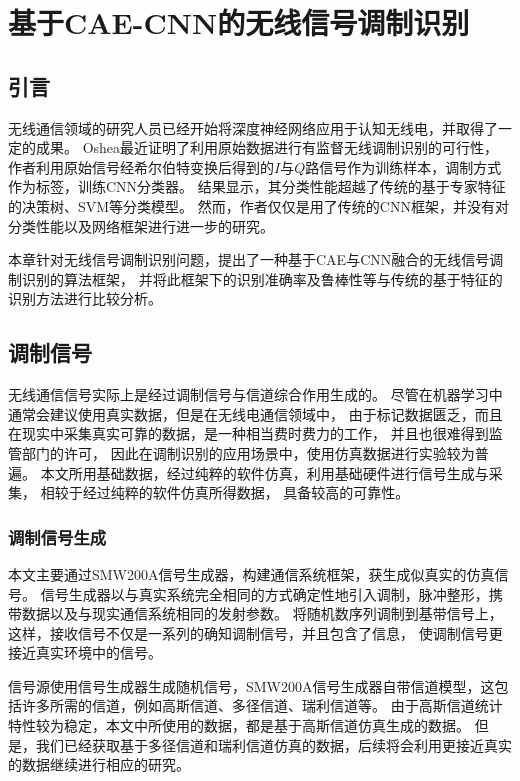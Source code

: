 \chapter{基于CAE-CNN的无线信号调制识别}

\section{引言}

无线通信领域的研究人员已经开始将深度神经网络应用于认知无线电，并取得了一定的成果。
Oshea最近证明了利用原始数据进行有监督无线调制识别的可行性，
作者利用原始信号经希尔伯特变换后得到的$I$与$Q$路信号作为训练样本，调制方式作为标签，训练CNN分类器。
结果显示，其分类性能超越了传统的基于专家特征的决策树、SVM等分类模型。
然而，作者仅仅是用了传统的CNN框架，并没有对分类性能以及网络框架进行进一步的研究。\par

本章针对无线信号调制识别问题，提出了一种基于CAE与CNN融合的无线信号调制识别的算法框架，
并将此框架下的识别准确率及鲁棒性等与传统的基于特征的识别方法进行比较分析。\par

\section{调制信号}

无线通信信号实际上是经过调制信号与信道综合作用生成的。
尽管在机器学习中通常会建议使用真实数据，但是在无线电通信领域中，
由于标记数据匮乏，而且在现实中采集真实可靠的数据，是一种相当费时费力的工作，
并且也很难得到监管部门的许可，
因此在调制识别的应用场景中，使用仿真数据进行实验较为普遍。
本文所用基础数据，经过纯粹的软件仿真，利用基础硬件进行信号生成与采集，
相较于经过纯粹的软件仿真所得数据，
具备较高的可靠性。\par
\subsection{调制信号生成}
本文主要通过SMW200A信号生成器，构建通信系统框架，获生成似真实的仿真信号。
信号生成器以与真实系统完全相同的方式确定性地引入调制，脉冲整形，携带数据以及与现实通信系统相同的发射参数。 
将随机数序列调制到基带信号上，这样，接收信号不仅是一系列的确知调制信号，并且包含了信息，
使调制信号更接近真实环境中的信号。\par

信号源使用信号生成器生成随机信号，SMW200A信号生成器自带信道模型，这包括许多所需的信道，例如高斯信道、多径信道、瑞利信道等。
由于高斯信道统计特性较为稳定，本文中所使用的数据，都是基于高斯信道仿真生成的数据。
但是，我们已经获取基于多径信道和瑞利信道仿真的数据，后续将会利用更接近真实的数据继续进行相应的研究。\par

